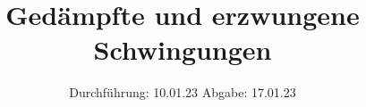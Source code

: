 



\subject{V354}
\title{Gedämpfte und erzwungene Schwingungen}
\date{%
  Durchführung: 10.01.23
  \hspace{3em}
  Abgabe: 17.01.23
}


\setlength{\parindent}{0pt} %

\maketitle
\thispagestyle{empty}
\tableofcontents
\newpage



%



\printbibliography{}




